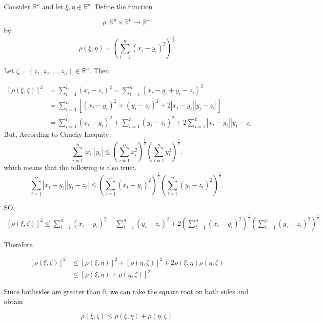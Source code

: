 \documentclass{article}
\begin{document}
Consider $\mathbb{R}^{n}$ and let $\xi, \eta \in \mathbb{R}^{n}$. Define the function

$$
\rho: \mathbb{R}^{n} \times \mathbb{R}^{n} \longrightarrow \mathbb{R}^{+}
$$
by
$$
\rho(\xi, \eta)=\left(\sum_{i=1}^{n}\left(x_{i}-y_{i}\right)^{2}\right)^{\frac{1}{2}}
$$

Let $\zeta=\left(z_{1}, z_{2}, \ldots, z_{n}\right) \in \mathbb{R}^{n}$. Then

$$
\begin{aligned}
{[\rho(\xi, \zeta)]^{2} } & =\sum_{i=1}^{n}\left(x_{i}-z_{i}\right)^{2}=\sum_{i=1}^{n}\left(x_{i}-y_{i}+y_{i}-z_{i}\right)^{2} \\
& =\sum_{i=1}^{n}\left[\left(x_{i}-y_{i}\right)^{2}+\left(y_{i}-z_{i}\right)^{2}+2\left|x_{i}-y_{i}\right|\left|y_{i}-z_{i}\right|\right] \\
& =\sum_{i=1}^{n}\left(x_{i}-y_{i}\right)^{2}+\sum_{i=1}^{n}\left(y_{i}-z_{i}\right)^{2}+2 \sum_{i=1}^{n}\left|x_{i}-y_{i}\right|\left|y_{i}-z_{i}\right|
\end{aligned}
$$
\newpage
But, According to Cauchy Inequity:
$$
\sum_{i=1}^{n}\left|x_{i}\right|\left|y_{i}\right| \leq\left(\sum_{i=1}^{n}x_{i}^{2}\right)^{\frac{1}{2}}\left(\sum_{i=1}^{n}y_{i}^{2}\right)^{\frac{1}{2}} .
$$
which means that the following is also true:.
$$
\sum_{i=1}^{n}\left|x_{i}-y_{i}\right|\left|y_{i}-z_{i}\right| \leq\left(\sum_{i=1}^{n}\left(x_{i}-y_{i}\right)^{2}\right)^{\frac{1}{2}}\left(\sum_{i=1}^{n}\left(y_{i}-z_{i}\right)^{2}\right)^{\frac{1}{2}} .
$$

SO,
$$
\begin{aligned}
{[\rho(\xi, \zeta)]^{2} } \leq \sum_{i=1}^{n}\left(x_{i}-y_{i}\right)^{2}+\sum_{i=1}^{n}\left(y_{i}-z_{i}\right)^{2}+2\left(\sum_{i=1}^{n}\left(x_{i}-y_{i}\right)^{2}\right)^{\frac{1}{2}}\left(\sum_{i=1}^{n}\left(y_{i}-z_{i}\right)^{2}\right)^{\frac{1}{2}}
\end{aligned}
$$

Therefore

$$
\begin{aligned}
{[\rho(\xi, \zeta)]^{2} } & \leq[\rho(\xi, \eta)]^{2}+[\rho(\eta, \zeta)]^{2}+2 \rho(\xi, \eta) \rho(\eta, \zeta) \\
& \leq[\rho(\xi, \eta)+\rho(\eta, \zeta)]^{2}
\end{aligned}
$$

Since bothsides are greater than 0, we can take the square root on both sides and obtain


\begin{equation}
\rho(\xi, \zeta) \leq \rho(\xi, \eta)+\rho(\eta, \zeta)
\end{equation}
\end{document}
